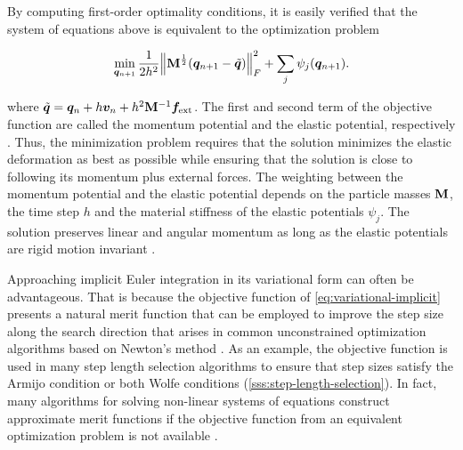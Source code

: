 \noindent By computing first-order optimality conditions, it is easily verified that the system of equations above is equivalent to the optimization 
problem

\begin{equation}\label{eq:variational-implicit}
    \min_{\bm{q}_{n+1}} \frac{1}{2h^2} \norm{\mathbf{M}^{\frac{1}{2}}(\bm{q}_{n+1} - \tilde{\bm{q}})}^2_F + \sum_j \psi_j(\bm{q}_{n+1}).
\end{equation}

\noindent where $\tilde{\bm{q}} = \bm{q}_n + h\bm{v}_n + h^2\mathbf{M}^{-1}\bm{f}_{\text{ext}}$.  
The first and second term of the objective function are called the momentum potential and the elastic potential, respectively \cite{bouaziz2014}. 
Thus, the minimization problem requires that the solution minimizes the elastic deformation as best as possible while ensuring that the solution is 
close to following its momentum plus external forces. The weighting between the momentum potential and the elastic potential depends on the 
particle masses $\mathbf{M}$, the time step $h$ and the material stiffness of the elastic potentials $\psi_j$. The solution preserves linear and 
angular momentum as long as the elastic potentials are rigid motion invariant \cite{bouaziz2014}.

Approaching implicit Euler integration in its variational form can often be advantageous. That is because the objective function of 
\autoref{eq:variational-implicit} presents a natural merit function that can be employed to improve the step size along the search direction 
that arises in common unconstrained optimization algorithms based on Newton's method \cite{nocedal2006}. As an example, the objective 
function is used in many step length selection algorithms to ensure that step sizes satisfy the Armijo condition or both Wolfe conditions 
(\cref{sss:step-length-selection}). In fact, many algorithms for solving non-linear systems of equations construct approximate merit functions 
if the objective function from an equivalent optimization problem is not available \cite{nocedal2006}.


